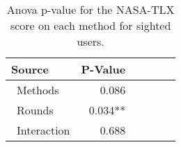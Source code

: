 
\begin{table}[!htb]
\centering
\caption{Anova p-value for the NASA-TLX score on each method for sighted users.}
\label{tab:blocanova_nasa_avg_two_way_sight}
\begin{tabular}{lrrrrl}
\toprule
          Source & P-Value \\
\midrule
    \    Methods &   0.086 \\
     \    Rounds & 0.034** \\
\    Interaction &   0.688 \\
\bottomrule
\end{tabular}
\end{table}

